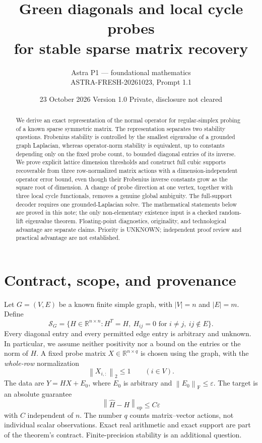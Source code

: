 \documentclass[11pt]{article}
\title{Green diagonals and local cycle probes\\for stable sparse matrix recovery}
\author{Astra P1 --- foundational mathematics\\ASTRA-FRESH-20261023, Prompt 1.1}
\date{23 October 2026 \quad Version 1.0 \quad Private, disclosure not cleared}
\theoremstyle{remark}\newtheorem{remark}[theorem]{Remark}
\newcommand{\R}{\mathbb R}
\newcommand{\op}{\mathrm{op}}
\newcommand{\F}{\mathrm F}
\newcommand{\SG}{\mathcal S_G}
\newcommand{\norm}[1]{\left\lVert #1\right\rVert}
\begin{document}
\maketitle
\begin{abstract}
We derive an exact representation of the normal operator for regular-simplex probing of a known sparse symmetric matrix. The representation separates two stability questions. Frobenius stability is controlled by the smallest eigenvalue of a grounded graph Laplacian, whereas operator-norm stability is equivalent, up to constants depending only on the fixed probe count, to bounded diagonal entries of its inverse. We prove explicit lattice dimension thresholds and construct full cubic supports recoverable from three row-normalized matrix actions with a dimension-independent operator error bound, even though their Frobenius inverse constants grow as the square root of dimension. A change of probe direction at one vertex, together with three local cycle functionals, removes a genuine global ambiguity. The full-support decoder requires one grounded-Laplacian solve. The mathematical statements below are proved in this note; the only non-elementary existence input is a checked random-lift eigenvalue theorem. Floating-point diagnostics, originality, and technological advantage are separate claims. Priority is UNKNOWN; independent proof review and practical advantage are not established.
\end{abstract}

\section{Contract, scope, and provenance}

Let $G=(V,E)$ be a known finite simple graph, with $|V|=n$ and $|E|=m$. Define
\[
\SG=\{H\in\R^{n\times n}: H^T=H,\ H_{ij}=0\text{ for }i\ne j,\ ij\notin E\}.
\]
Every diagonal entry and every permitted edge entry is arbitrary and unknown. In particular, we assume neither positivity nor a bound on the entries or the norm of $H$. A fixed probe matrix $X\in\R^{n\times q}$ is chosen using the graph, with the \emph{whole-row} normalization
\[
\norm{X_{i,:}}_2\leq 1\qquad(i\in V).
\]
The data are $Y=HX+E_0$, where $E_0$ is arbitrary and $\norm{E_0}_{\F}\leq\varepsilon$. The target is an absolute guarantee
\[
\norm{\widehat H-H}_{\op}\leq C\varepsilon
\]
with $C$ independent of $n$. The number $q$ counts matrix--vector actions, not individual scalar observations. Exact real arithmetic and exact support are part of the theorem's contract. Finite-precision stability is an additional question.
\end{document}
